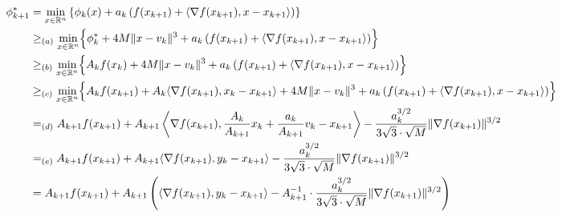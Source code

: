 \documentclass[moor,sglanonrev]{informs4}
\begin{document}
{\color{red}
        \begin{align*}
            \phi_{k+1}^*
             & = \min_{x\in\mathbb{R}^n} \left\{ \phi_k(x) + a_k \left(f(x_{k+1}) + \langle \nabla f(x_{k+1}), x - x_{k+1} \rangle \right) \right\}                                                                                        \\
             & \geq_{(a)} \min_{x\in\mathbb{R}^n} \Bigl\{ \phi_k^* + 4M \|x - v_k\|^3
            + a_k \left(f(x_{k+1}) + \langle \nabla f(x_{k+1}), x - x_{k+1} \rangle \right) \Bigr\}                                                                                                                                        \\
             & \geq_{(b)} \min_{x\in\mathbb{R}^n} \Bigl\{ A_k f(x_k) + 4M \|x - v_k\|^3
            + a_k \left(f(x_{k+1}) + \langle \nabla f(x_{k+1}), x - x_{k+1} \rangle \right) \Bigr\}                                                                                                                                        \\
             & \geq_{(c)} \min_{x\in\mathbb{R}^n} \Bigl\{ A_k f(x_{k+1}) + A_k \langle \nabla f(x_{k+1}), x_k - x_{k+1} \rangle + 4M \|x - v_k\|^3 + a_k \left(f(x_{k+1}) + \langle \nabla f(x_{k+1}), x - x_{k+1} \rangle \right) \Bigr\} \\
             & =_{(d)} A_{k+1} f(x_{k+1})
            + A_{k+1} \left\langle \nabla f(x_{k+1}),
            \frac{A_k}{A_{k+1}} x_k + \frac{a_k}{A_{k+1}} v_k - x_{k+1} \right\rangle - \frac{a_k^{3/2}}{3\sqrt{3} \cdot \sqrt{M}} \|\nabla f(x_{k+1})\|^{3/2}                                                                             \\
             & =_{(e)} A_{k+1} f(x_{k+1}) + A_{k+1} \langle \nabla f(x_{k+1}), y_k - x_{k+1} \rangle
            - \frac{a_k^{3/2}}{3\sqrt{3} \cdot \sqrt{M}} \|\nabla f(x_{k+1})\|^{3/2}                                                                                                                                                       \\
             & = A_{k+1} f(x_{k+1}) + A_{k+1} \left(
            \langle \nabla f(x_{k+1}), y_k - x_{k+1} \rangle
            - A_{k+1}^{-1} \cdot \frac{a_k^{3/2}}{3\sqrt{3} \cdot \sqrt{M}}
            \|\nabla f(x_{k+1})\|^{3/2} \right)                                                                                                                                                                                            \\

\end{align*}}
\end{document}
